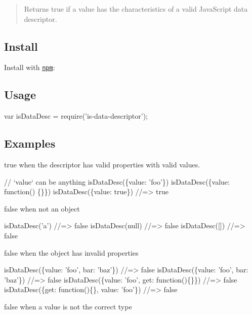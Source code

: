 \begin{quote}
Returns true if a value has the characteristics of a valid Java\+Script data descriptor. \end{quote}


\subsection*{Install}

Install with \href{https://www.npmjs.com/}{\tt npm}\+:




\subsection*{Usage}


\begin{DoxyCode}
var isDataDesc = require('is-data-descriptor');
\end{DoxyCode}


\subsection*{Examples}

{\ttfamily true} when the descriptor has valid properties with valid values.


\begin{DoxyCode}
// `value` can be anything
isDataDesc(\{value: 'foo'\})
isDataDesc(\{value: function() \{\}\})
isDataDesc(\{value: true\})
//=> true
\end{DoxyCode}


{\ttfamily false} when not an object


\begin{DoxyCode}
isDataDesc('a')
//=> false
isDataDesc(null)
//=> false
isDataDesc([])
//=> false
\end{DoxyCode}


{\ttfamily false} when the object has invalid properties


\begin{DoxyCode}
isDataDesc(\{value: 'foo', bar: 'baz'\})
//=> false
isDataDesc(\{value: 'foo', bar: 'baz'\})
//=> false
isDataDesc(\{value: 'foo', get: function()\{\}\})
//=> false
isDataDesc(\{get: function()\{\}, value: 'foo'\})
//=> false
\end{DoxyCode}


{\ttfamily false} when a value is not the correct type


